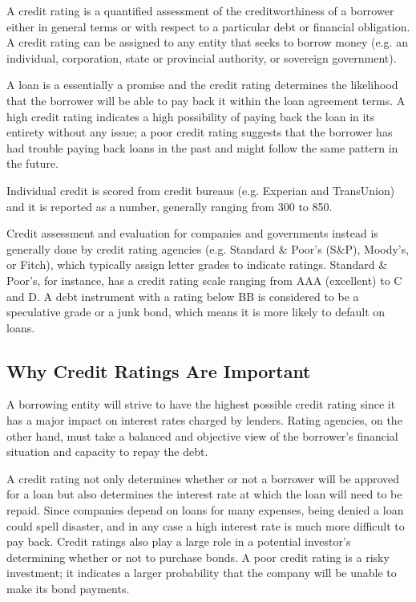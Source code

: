 A credit rating is a quantified assessment of the creditworthiness of a borrower either in general terms or with respect to a particular debt or financial obligation. A credit rating can be assigned to any entity that seeks to borrow money (e.g. an individual, corporation, state or provincial authority, or sovereign government).

A loan is a essentially a promise and the credit rating determines the likelihood that the borrower will be able to pay back it within the loan agreement terms. A high credit rating indicates a high possibility of paying back the loan in its entirety without any issue; a poor credit rating suggests that the borrower has had trouble paying back loans in the past and might follow the same pattern in the future.

Individual credit is scored from credit bureaus (e.g. Experian and TransUnion) and it is reported as a number, generally ranging from 300 to 850.

Credit assessment and evaluation for companies and governments instead is generally done by credit rating agencies (e.g. Standard \& Poor's (S\&P), Moody's, or Fitch), which typically assign letter grades to indicate ratings. Standard \& Poor's, for instance, has a credit rating scale ranging from AAA (excellent) to C and D. A debt instrument with a rating below BB is considered to be a speculative grade or a junk bond, which means it is more likely to default on loans.

\subsection{Why Credit Ratings Are Important}\label{why-credit-ratings-are-important}

A borrowing entity will strive to have the highest possible credit rating since it has a major impact on interest rates charged by lenders. Rating agencies, on the other hand, must take a balanced and objective view of the borrower's financial situation and capacity to repay the debt.

A credit rating not only determines whether or not a borrower will be approved for a loan but also determines the interest rate at which the loan will need to be repaid. Since companies depend on loans for many expenses, being denied a loan could spell disaster, and in any case a high interest rate is much more difficult to pay back.
Credit ratings also play a large role in a potential investor's determining whether or not to purchase bonds. A poor credit rating is a risky investment; it indicates a larger probability that the company will be unable to make its bond payments.

